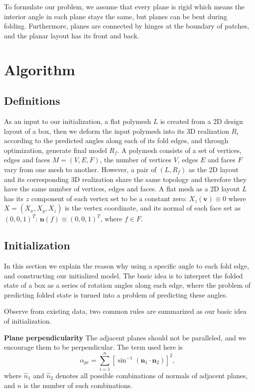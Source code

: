 \documentclass[submission]{gmp2018}
\begin{document}
To formulate our problem, we assume that every plane is rigid which means the interior angle in each plane stays the same, but planes can be bent during folding. Furthermore, planes are connected by hinges at the boundary of patches, and the planar layout has its front and back.


\section{Algorithm}\label{sec:optimization}
\subsection{Definitions}
As an input to our initialization, a flat polymesh $L$ is created from a 2D design layout of a box, then we deform the input polymesh into its 3D realization $R_i$ according to the predicted angles along each of its fold edges, and through optimization, generate final model $R_f$. A polymesh consists of a set of vertices, edges and faces $M = (V,E,F)$, the number of vertices $V$, edges $E$ and faces $F$ vary from one mesh to another. However, a pair of $(L,R_f)$ as the 2D layout and its corresponding 3D realization share the same topology and therefore they have the same number of vertices, edges and faces. A flat mesh as a 2D layout $L$ has its $z$ component of each vertex set to be a constant zero: $X_z(\mathbf{v}) \equiv 0$ where $X = (X_x,X_y,X_z)$ is the vertex coordinate, and its normal of each face set as $(0,0,1)^T$: $\mathbf{n}(f) \equiv (0,0,1)^T$, where $f \in F$.

\subsection{Initialization}\label{sec:initialization}
In this section we explain the reason why using a specific angle to each fold edge, and constructing our initialized model. The basic idea is to interpret the folded state of a box as a series of rotation angles along each edge, where the problem of predicting folded state is turned into a problem of predicting these angles.

Observe from existing data, two common rules are summarized as our basic idea of initialization.

\noindent
\textbf{Plane perpendicularity} The adjacent planes should not be paralleled, and we encourage them to be perpendicular. The term used here is
\begin{equation}
\alpha_{pe} = \sum_{i = 1}^{n} [\sin^{-1}(\mathbf{n}_1 \cdot \mathbf{n}_2)]^{2},
\label{equ:perp}
\end{equation}
where $\hat{n}_1$ and $\hat{n}_2$ denotes all possible combinations of normals of adjacent planes, and $n$ is the number of such combinations.
\end{document}
